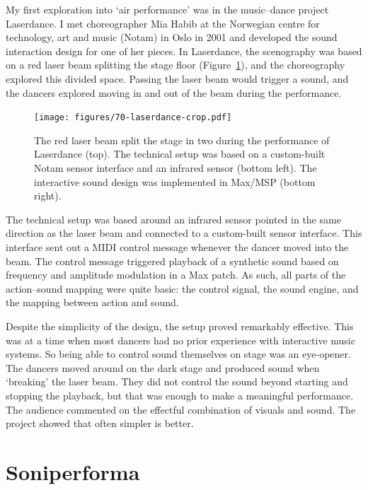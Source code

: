 My first exploration into `air performance' was in the music--dance project Laserdance. I met choreographer Mia Habib at the Norwegian centre for technology, art and music (Notam) in Oslo in 2001 and developed the sound interaction design for one of her pieces. In Laserdance, the scenography was based on a red laser beam splitting the stage floor (Figure~\ref{fig:laserdans02}), and the choreography explored this divided space. Passing the laser beam would trigger a sound, and the dancers explored moving in and out of the beam during the performance.

\begin{figure}[tbp]
		\texttt{[image: figures/70-laserdance-crop.pdf]}
	\caption{The red laser beam split the stage in two during the performance of Laserdance (top). The technical setup was based on a custom-built Notam sensor interface and an infrared sensor (bottom left). The interactive sound design was implemented in Max/MSP (bottom right).}
	\label{fig:laserdans02}
\end{figure}

The technical setup was based around an infrared sensor pointed in the same direction as the laser beam and connected to a custom-built sensor interface. This interface sent out a MIDI control message whenever the dancer moved into the beam. The control message triggered playback of a synthetic sound based on frequency and amplitude modulation in a Max patch. As such, all parts of the action--sound mapping were quite basic: the control signal, the sound engine, and the mapping between action and sound.

Despite the simplicity of the design, the setup proved remarkably effective. This was at a time when most dancers had no prior experience with interactive music systems. So being able to control sound themselves on stage was an eye-opener. The dancers moved around on the dark stage and produced sound when `breaking' the laser beam. They did not control the sound beyond starting and stopping the playback, but that was enough to make a meaningful performance. The audience commented on the effectful combination of visuals and sound. The project showed that often simpler is better.


\section{Soniperforma}

